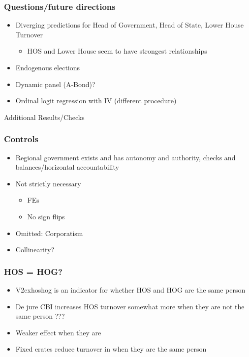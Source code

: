 \documentclass[]{beamer}
\begin{document}
    \begin{frame}
        \frametitle{Questions/future directions}
        \begin{itemize}
            \item Diverging predictions for Head of Government, Head of State, Lower House Turnover
            \begin{itemize}
                \item HOS and Lower House seem to have strongest relationships
            \end{itemize}
            \item Endogenous elections
            \item Dynamic panel (A-Bond)?
            \item Ordinal logit regression with IV (different procedure)
        \end{itemize}
    \end{frame}


    \begin{frame}
        \centering Additional Results/Checks
    \end{frame}


    \begin{frame}
        \frametitle{Controls}
        \begin{itemize}
            \item Regional government exists and has autonomy and authority, checks and balances/horizontal accountability
            \item Not strictly necessary
        \begin{itemize}
            \item FEs
            \item No sign flips
        \end{itemize}
            \item Omitted: Corporatism
            \item Collinearity?
        \end{itemize}
    \end{frame}


    \begin{frame}
        \frametitle{HOS = HOG?}
        \begin{itemize}
            \item V2exhoshog is an indicator for whether HOS and HOG are the same person
            \item De jure CBI increases HOS turnover somewhat more when they are not the same person ???
            \item Weaker effect when they are
            \item Fixed erates reduce turnover in when they are the same person
        \end{itemize}
    \end{frame}
\end{document}
